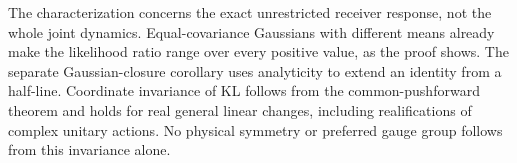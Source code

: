 The characterization concerns the exact unrestricted receiver response, not the whole joint dynamics. Equal-covariance Gaussians with different means already make the likelihood ratio range over every positive value, as the proof shows. The separate Gaussian-closure corollary uses analyticity to extend an identity from a half-line. Coordinate invariance of KL follows from the common-pushforward theorem and holds for real general linear changes, including realifications of complex unitary actions. No physical symmetry or preferred gauge group follows from this invariance alone.
